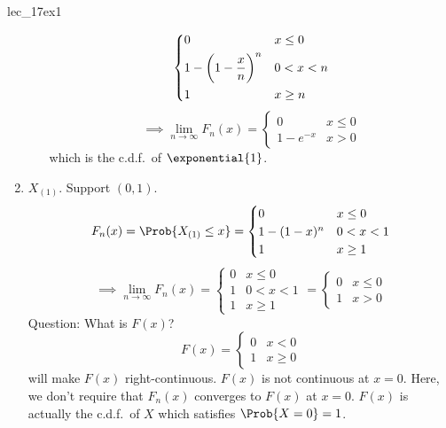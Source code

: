 \begin{Example}{}{lec_17ex1}
\begin{enumerate}[label=(\roman*)]
\begin{itemize}
\[\begin{dcases}
                                0                               & x\le 0 \\
                                1-\biggl(1-\frac{x}{n}\biggr)^n & 0<x<n  \\
                                1                               & x\ge n
                            \end{dcases} \]
                        \[ \implies
                            \lim\limits_{{n} \to {\infty}} F_n(x)=
                            \begin{cases}
                                0        & x\le 0 \\
                                1-e^{-x} & x>0
                            \end{cases} \]
                        which is the c.d.f.\ of $ \exponential{1} $.
              \end{itemize}
        \item $ X_{(1)} $. Support $ (0,1) $.
              \[ F_n(x)=\Prob{X_{(1)}\le x}=
                  \begin{cases}
                      0         & x\le 0 \\
                      1-(1-x)^n & 0<x<1  \\
                      1         & x\ge 1
                  \end{cases} \]
              \[ \implies \lim\limits_{{n} \to {\infty}} F_n(x)=
                  \begin{cases}
                      0 & x\le 0 \\
                      1 & 0<x<1  \\
                      1 & x\ge 1
                  \end{cases}=
                  \begin{cases}
                      0 & x\le 0 \\
                      1 & x>0
                  \end{cases} \]
              Question: What is $ F(x) $?
              \[ F(x)=\begin{cases}
                      0 & x<0    \\
                      1 & x\ge 0
                  \end{cases} \]
              will make $ F(x) $ right-continuous.
              $ F(x) $ is not continuous at $ x=0 $.
              Here, we don't require that $ F_n(x) $ converges
              to $ F(x) $ at $ x=0 $. $ F(x) $
              is actually the c.d.f.\ of $ X $
              which satisfies $ \Prob{X=0}=1 $.


\end{enumerate}
\end{Example}
